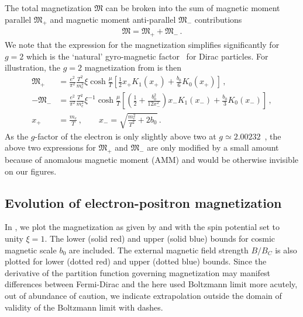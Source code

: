 The total magnetization ${\mathfrak M}$ can be broken into the sum of magnetic moment parallel ${\mathfrak M}_{+}$ and magnetic moment anti-parallel ${\mathfrak M}_{-}$ contributions
\begin{align}
\label{g2mag}
{\mathfrak M}={\mathfrak M}_{+}+{\mathfrak M}_{-}\,.
\end{align}
We note that the expression for the magnetization simplifies significantly for $g\!=\!2$ which is the `natural' gyro-magnetic factor~\citep{Evans:2022fsu,Rafelski:2022bsv} for Dirac particles. For illustration, the $g\!=\!2$ magnetization from  is then
\begin{align}
 \label{g2magplus}
 {\mathfrak M}_{+}&=\frac{e^{2}}{\pi^{2}}\frac{T^{2}}{m_{e}^{2}}\xi\cosh{\frac{\mu}{T}}\left[\frac{1}{2}x_{+}K_{1}(x_{+})+\frac{b_{0}}{6}K_{0}(x_{+})\right]\,,\\
 \label{g2magminus}
 -{\mathfrak M}_{-}&=\frac{e^{2}}{\pi^{2}}\frac{T^{2}}{m_{e}^{2}}\xi^{-1}\cosh{\frac{\mu}{T}}
 \left[\left(\frac{1}{2}+\frac{b_{0}^{2}}{12x_{-}^{2}}\right)x_{-}K_{1}(x_{-})+\frac{b_{0}}{3}K_{0}(x_{-})\right]\,,\\
 x_{+}&=\frac{m_{e}}{T}\,,\qquad
 x_{-}=\sqrt{\frac{m_{e}^{2}}{T^{2}}+2b_{0}}\,.
\end{align}
As the $g$-factor of the electron is only slightly above two at $g\simeq2.00232$~\citep{Tiesinga:2021myr}, the above two expressions for ${\mathfrak M}_{+}$ and ${\mathfrak M}_{-}$ are only modified by a small amount because of anomalous magnetic moment (AMM) and would be otherwise invisible on our figures.

\subsection{Evolution of electron-positron magnetization}
\label{sec:paramagnetism}
\noindent In , we plot the magnetization as given by  and  with the spin potential set to unity $\xi=1$. The lower (solid red) and upper (solid blue) bounds for cosmic magnetic scale $b_{0}$ are included. The external magnetic field strength ${B}/{B}_{C}$ is also plotted for lower (dotted red) and upper (dotted blue) bounds. Since the derivative of the partition function governing magnetization may manifest differences between Fermi-Dirac and the here used Boltzmann limit more acutely, out of abundance of caution, we indicate extrapolation outside the domain of validity of the Boltzmann limit with dashes.

